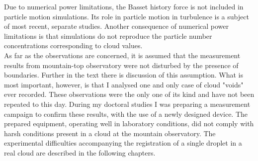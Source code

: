 \documentclass[../main.tex]{subfiles}
\begin{document}
Due to numerical power limitations, the Basset history force is not included in particle motion simulations. Its role in particle motion in turbulence is a subject of most recent, separate studies. Another consequence of numerical power limitations is that simulations do not reproduce the particle number concentrations corresponding to cloud values.\\
As far as the observations are concerned, it is assumed that the measurement results from mountain-top observatory were not disturbed by the presence of boundaries. Further in the text there is discussion of this assumption. What is most important, however, is that I analysed one and only case of cloud "voids" ever recorded. These observations were the only one of its kind and have not been repeated to this day. During my doctoral studies I was preparing a measurement campaign to confirm these results, with the use of a newly designed device. The prepared equipment, operating well in laboratory conditions, did not comply with harsh conditions present in a cloud at the mountain observatory. The experimental difficulties accompanying the registration of a single droplet in a real cloud are described in the following chapters.\\



\end{document}
